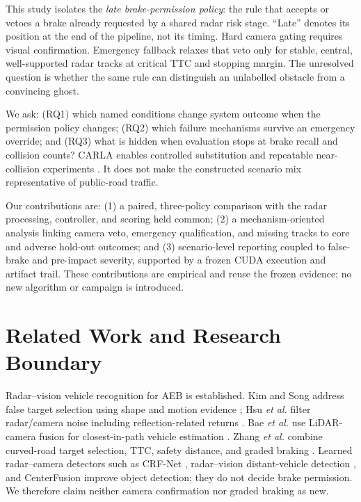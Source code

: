 \documentclass[conference]{IEEEtran}
\begin{document}
This study isolates the \emph{late brake-permission policy}: the rule that
accepts or vetoes a brake already requested by a shared radar risk stage.
``Late'' denotes its position at the end of the pipeline, not its timing.
Hard camera gating requires visual confirmation. Emergency fallback relaxes
that veto only for stable, central, well-supported radar tracks at critical TTC
and stopping margin. The unresolved question is whether
the same rule can distinguish an unlabelled obstacle from a convincing ghost.

We ask: (RQ1) which named conditions change system outcome when the permission
policy changes; (RQ2) which failure mechanisms survive an emergency override;
and (RQ3) what is hidden when evaluation stops at brake recall and collision
counts? CARLA enables controlled substitution and repeatable near-collision
experiments \cite{dosovitskiy2017carla,kang2019testing}. It does not make the
constructed scenario mix representative of public-road traffic.

Our contributions are: (1) a paired, three-policy comparison with the radar
processing, controller, and scoring held common; (2) a mechanism-oriented
analysis linking camera veto, emergency qualification, and missing tracks to
core and adverse hold-out outcomes; and (3) scenario-level reporting coupled to
false-brake and pre-impact severity, supported by a frozen CUDA execution and
artifact trail. These contributions are empirical and reuse the frozen
evidence; no new algorithm or campaign is introduced.

\section{Related Work and Research Boundary}
Radar--vision vehicle recognition for AEB is established. Kim and Song address
false target selection using shape and motion evidence \cite{kim2013vehicle};
Hsu \emph{et al.} filter radar/camera noise including reflection-related returns
\cite{hsu2015noise}. Bae \emph{et al.} use LiDAR-camera fusion for closest-in-path
vehicle estimation \cite{bae2021cipv}. Zhang \emph{et al.} combine curved-road
target selection, TTC, safety distance, and graded braking
\cite{zhang2023curved}. Learned radar--camera detectors such as CRF-Net
\cite{nobis2019crfnet}, radar--vision distant-vehicle detection
\cite{chadwick2019distant}, and CenterFusion \cite{nabati2021centerfusion}
improve object detection; they do not decide brake permission. We therefore
claim neither camera confirmation nor graded braking as new.
\end{document}
